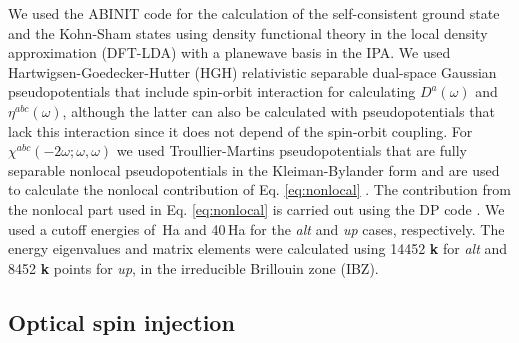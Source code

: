 \documentclass[pss]{wiley2sp} %
\begin{document}
We used the ABINIT code \cite{gonzeCPC09} for the calculation of the self-consistent ground state and the Kohn-Sham states using density functional theory in the local density approximation (DFT-LDA) with a planewave basis in the IPA. We used Hartwigsen-Goedecker-Hutter (HGH) relativistic separable dual-space Gaussian pseudopotentials \cite{hartwigsenPRB98} that include spin-orbit interaction for calculating $D^{a}(\omega)$ and {$\eta^{abc}(\omega)$}, although the latter can also be calculated with pseudopotentials that lack this interaction since it does not depend of the spin-orbit coupling. For $\chi^{abc}(-2\omega;\omega,\omega)$ we used Troullier-Martins pseudopotentials \cite{troullierPRB91} that are fully separable nonlocal pseudopotentials in the Kleiman-Bylander form and are used to calculate the nonlocal contribution of Eq. \eqref{eq:nonlocal} \cite{kleinmanPRL82}. The contribution from the nonlocal part used in Eq. \eqref{eq:nonlocal} is carried out using the DP code \cite{olevanoDP}. We used a cutoff energies of {\,Ha and 40\,Ha for the \emph{alt} and \emph{up} cases, respectively}. The energy eigenvalues and matrix elements were calculated using 14452 \textbf{k} for \emph{alt} and 8452 \textbf{k} points for \emph{up}, in the irreducible Brillouin zone (IBZ).

\subsection{Optical spin injection}\label{subsec:results-DSP}
\end{document}
